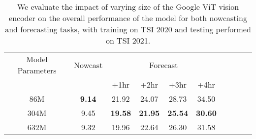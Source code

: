 
\begin{table}[h!]
  \caption{We evaluate the impact of varying size of the Google ViT vision encoder on the overall performance of the model for both nowcasting and forecasting tasks, with training on TSI 2020 and testing performed on TSI 2021.}
  \label{tab:encoder_sizes_ablation}
  \begin{tabular}{cccccc cccc}
    \toprule
    Model Parameters & \multicolumn{1}{c}{Nowcast} & \multicolumn{4}{c}{Forecast} \\
     \cmidrule(lr){3-6}
    & & +1hr & +2hr & +3hr & +4hr \\
    \midrule
    86M & \textbf{9.14} & 21.92 & 24.07 & 28.73 & 34.50 \\
    304M & 9.45 & \textbf{19.58} & \textbf{21.95} & \textbf{25.54} & \textbf{30.60} \\
    632M & 9.32 & 19.96 & 22.64 & 26.30 & 31.58 \\
    \bottomrule
  \end{tabular}
\end{table}
